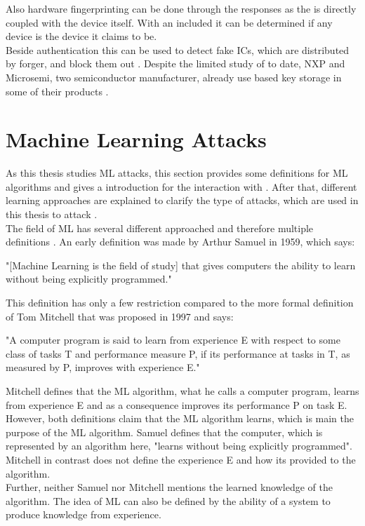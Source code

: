 Also hardware fingerprinting can be done through the \puf responses as the \puf is directly coupled with the device itself.
With an included \puf it can be determined if any device is the device it claims to be.\\
Beside authentication this can be used to detect fake \acp{IC}, which are distributed by forger, and block them out \cite{Machida2015ImplementationFPGA}.
Despite the limited study of \pufs to date, \acl{NXP} and Microsemi, two semiconductor manufacturer, already use \puf based key storage in some of their products \cite{Becker2015ThePUFs}.



\section{Machine Learning Attacks}

As this thesis studies \acf{ML} attacks, this section provides some definitions for \ac{ML} algorithms and gives a introduction for the interaction with \pufs.
After that, different learning approaches are explained to clarify the type of attacks, which are used in this thesis to attack \pufs.\\
The field of \ac{ML} has several different approached and therefore multiple definitions \cite{2017MachineLearning}.
An early definition was made by Arthur Samuel in 1959, which says:

"[Machine Learning is the field of study] that gives computers the ability to learn without being explicitly programmed." \cite{Samuel1959SomeCheckers}

This definition has only a few restriction compared to the more formal definition of Tom Mitchell that was proposed in 1997 and says:

"A computer program is said to learn from experience E with respect to some class of tasks T and performance measure P, if its performance at tasks in T, as measured by P, improves with experience E." \cite{Mitchell1997MachineLearning}

Mitchell defines that the \ac{ML} algorithm, what he calls a computer program, learns from experience E and as a consequence improves its performance P on task E.\\
However, both definitions claim that the \ac{ML} algorithm learns, which is main the purpose of the \ac{ML} algorithm.
Samuel defines that the computer, which is represented by an algorithm here, "learns without being explicitly programmed".
Mitchell in contrast does not define the experience E and how its provided to the algorithm.\\
Further, neither Samuel nor Mitchell mentions the learned knowledge of the algorithm.
The idea of \acf{ML} can also be defined by the ability of a system to produce knowledge from experience.

